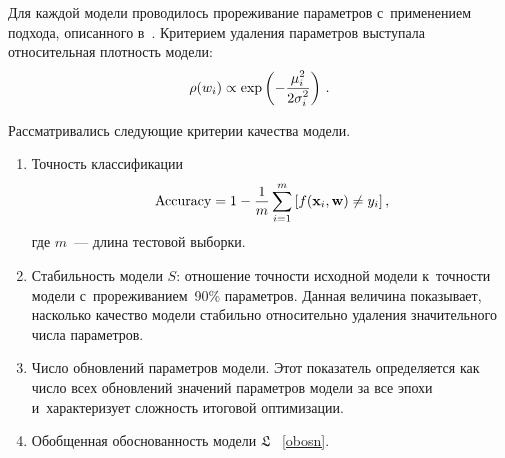 \begin{multicols}{2}
Для каждой модели проводилось прореживание параметров с~применением подхода, 
описанного в~\cite{conf/nips/Graves11}. Критерием удаления параметров выступала 
относительная плотность модели:
$$
\rho(w_i) \propto \exp\left( - \displaystyle\frac{\displaystyle \mu_i^{2}\mathstrut}{\displaystyle 2 \sigma_i^{2}\mathstrut}\right)\,.
$$
 
 Рассматривались следующие критерии качества модели.
\begin{enumerate}
\item Точность классификации
$$
\mbox{Accuracy} = 1 - \displaystyle\frac{\displaystyle 1\mathstrut}{\displaystyle m\mathstrut} \sum\limits_{i = 1}^{m}\left[f(\mathbf{x}_i, \mathbf{w}) 
\neq y_i\right],
$$
где $m$~--- длина тестовой выборки.

 \item Стабильность модели $S$: отношение точности исходной модели к~точности 
модели с~прореживанием~90\% параметров. Данная величина показывает, насколько 
качество модели стабильно относительно удаления значительного числа параметров.
\item Число обновлений параметров модели. Этот показатель определяется как число 
всех об\-нов\-ле\-ний значений параметров модели за все эпохи и~характеризует 
сложность итоговой оптимизации.
  \item Обобщенная обоснованность модели $\mathfrak{L}$ ~\eqref{obosn}.
\end{enumerate}


\begin{figure*}[b] %
\vspace*{-4pt}
\begin{center}
\mbox{%
\epsfxsize=160mm %
}
\end{center}
\vspace*{-15pt}
\label{fig_1}
\end{figure*}


\begin{table*}[b]\small %
\vspace*{-6pt}
\begin{center}
\label{t1}
\vspace*{2ex}


\end{center}
\end{table*}
\end{multicols}
